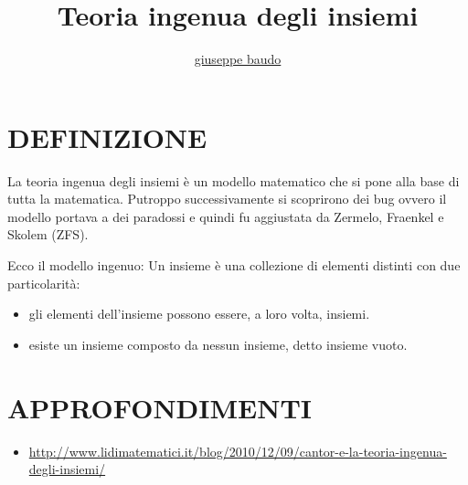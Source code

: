 \documentclass[a4paper,10pt]{article}
\title{Teoria ingenua degli insiemi}
\author{\href{http://www.baudo.hol.es}{giuseppe baudo}}
\begin{document}
\maketitle

\section{DEFINIZIONE}
La teoria ingenua degli insiemi è un modello matematico che si pone alla base di tutta la matematica.  
Putroppo successivamente si scoprirono dei bug ovvero
il modello portava a dei paradossi e quindi fu aggiustata da Zermelo, Fraenkel e Skolem (ZFS). 

Ecco il modello ingenuo:  
Un insieme è una collezione di elementi distinti con due particolarità:  
\begin{itemize}
 \item gli elementi dell'insieme possono essere, a loro volta, insiemi.
 \item esiste un insieme composto da nessun insieme, detto insieme vuoto.
\end{itemize}

\section{APPROFONDIMENTI}
\begin{itemize}
 \item \url{http://www.lidimatematici.it/blog/2010/12/09/cantor-e-la-teoria-ingenua-degli-insiemi/}
\end{itemize}
\end{document}

